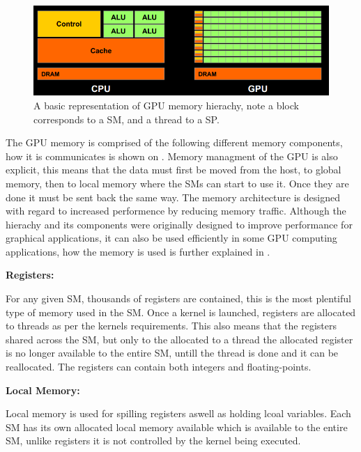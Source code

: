 \begin{figure}[h!]
\centering
 \includegraphics[trim=1.4cm 6.1cm 6.5cm 1.8cm, clip, width=1\textwidth]{figures/GPUCPUimage.PNG} %
\caption{A basic representation of GPU memory hierachy, note a block corresponds to a SM, and a thread to a SP.}\label{image:GPUMemory} 
\end{figure}
The GPU memory is comprised of the following different memory components, how it is communicates is shown on . 
Memory managment of the GPU is also explicit, this means that the data must first be moved from the host, to global memory, then to local memory where the SMs can start to use it. 
Once they are done it must be sent back the same way.
The memory architecture is designed with regard to increased performence by reducing memory traffic.
Although the hierachy and its components were originally designed to improve performance for graphical applications, it can also be used efficiently in some GPU computing applications, how the memory is used is further explained in . %

\textbf{Registers:}

For any given SM, thousands of registers are contained, this is the most plentiful type of memory used in the SM. 
Once a kernel is launched, registers are allocated to threads as per the kernels requirements.
This also means that the registers shared across the SM, but only to the allocated to a thread the allocated register is no longer available to the entire SM, untill the thread is done and it can be reallocated.
The registers can contain both integers and floating-points.

\textbf{Local Memory:}

Local memory is used for spilling registers aswell as holding lcoal variables.
Each SM has its own allocated local memory available which is available to the entire SM, unlike registers it is not controlled by the kernel being executed.

